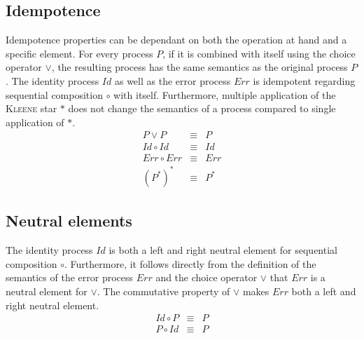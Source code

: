 \subsection{Idempotence}
Idempotence properties can be dependant on both the operation at hand and a specific element. For every process $P$, if it is combined with itself using the choice operator $\vee$, the resulting process has the same semantics as the original process $P$. The identity process $Id$ as well as the error process $Err$ is idempotent regarding sequential composition $\circ$ with itself. Furthermore, multiple application of the \textsc{Kleene} star $*$ does not change the semantics of a process compared to single application of $*$.
\begin{eqnarray*}
  P \vee P & \equiv & P \\
  Id \circ Id & \equiv & Id \\
  Err \circ Err & \equiv & Err \\
  (P^*)^* & \equiv & P^*
\end{eqnarray*}

\subsection{Neutral elements}
The identity process $Id$ is both a left and right neutral element for sequential composition $\circ$. Furthermore, it follows directly from the definition of the semantics of the error process $Err$ and the choice operator $\vee$ that $Err$ is a neutral element for $\vee$. The commutative property of $\vee$ makes $Err$ both a left and right neutral element.
\begin{eqnarray*}
  Id \circ P & \equiv & P \\
  P \circ Id & \equiv & P
\end{eqnarray*}